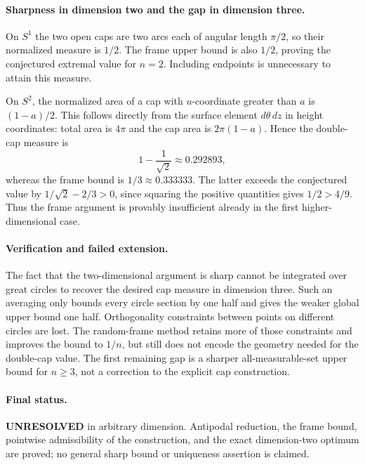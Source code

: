 \documentclass[11pt,a4paper]{article}
\begin{document}
\paragraph{Sharpness in dimension two and the gap in dimension three.}
On $S^1$ the two open caps are two arcs each of angular length
$\pi/2$, so their normalized measure is $1/2$. The frame upper
bound is also $1/2$, proving the conjectured extremal value for
$n=2$. Including endpoints is unnecessary to attain this measure.

On $S^2$, the normalized area of a cap with $u$-coordinate greater
than $a$ is $(1-a)/2$. This follows directly from the surface element
$d\theta\,dz$ in height coordinates: total area is $4\pi$ and the
cap area is $2\pi(1-a)$. Hence the double-cap measure is
\[
 1-\frac1{\sqrt2}\approx0.292893,
\]
whereas the frame bound is $1/3\approx0.333333$. The latter exceeds
the conjectured value by $1/\sqrt2-2/3>0$, since squaring the
positive quantities gives $1/2>4/9$. Thus the frame argument is
provably insufficient already in the first higher-dimensional case.

\paragraph{Verification and failed extension.}
The fact that the two-dimensional argument is sharp cannot be
integrated over great circles to recover the desired cap measure
in dimension three. Such an averaging only bounds every circle
section by one half and gives the weaker global upper bound one
half. Orthogonality constraints between points on different circles
are lost. The random-frame method retains more of those constraints
and improves the bound to $1/n$, but still does not encode the
geometry needed for the double-cap value. The first remaining gap
is a sharper all-measurable-set upper bound for $n\ge3$, not a
correction to the explicit cap construction.

\paragraph{Final status.}
\textbf{UNRESOLVED} in arbitrary dimension. Antipodal reduction,
the frame bound, pointwise admissibility of the construction, and
the exact dimension-two optimum are proved; no general sharp bound
or uniqueness assertion is claimed.
\end{document}
